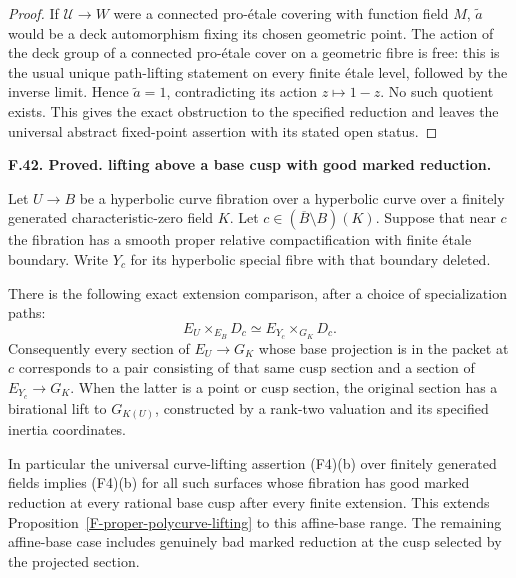\documentclass[11pt,oneside]{article}
\makeatletter
\newcounter{statementanchor}
\newenvironment{statement}[3]{%
 \refstepcounter{statementanchor}\def\@currentlabel{#1}%
 \par\addvspace{9pt}\noindent
 \textbf{#1. #2. #3.}\par\nobreak\noindent\ignorespaces
}{\par\addvspace{5pt}}
\makeatother
\begin{document}
\begin{proof}
If $\mathcal U\to W$ were a connected pro-\'etale
covering with function field $M$, $\widetilde a$ would
be a deck automorphism fixing its chosen geometric point.
The action of the deck group of a connected pro-\'etale
cover on a geometric fibre is free: this is the usual
unique path-lifting statement on every finite \'etale
level, followed by the inverse limit. Hence
$\widetilde a=1$, contradicting its action $z\mapsto1-z$.
No such quotient exists. This gives the exact obstruction
to the specified reduction and leaves the universal
abstract fixed-point assertion with its stated open status.
\end{proof}

\begin{statement}{F.42}{Proved}{lifting above a base cusp with good marked reduction}
\label{st:F.42}
\label{F-good-boundary-lifting}
Let $U\to B$ be a hyperbolic curve fibration over a hyperbolic
curve over a finitely generated characteristic-zero field $K$.
Let $c\in(\overline B\setminus B)(K)$. Suppose that near $c$
the fibration has a smooth proper relative compactification
with finite \'etale boundary. Write $Y_c$ for its hyperbolic
special fibre with that boundary deleted.

There is the following exact extension comparison, after a
choice of specialization paths:
\[
 E_U\mathbin{\times}_{E_B}D_c
       \simeq E_{Y_c}\mathbin{\times}_{G_K}D_c.
 \tag{F.42.1}
\]
Consequently every section of $E_U\to G_K$ whose base
projection is in the packet at $c$ corresponds to a pair
consisting of that same cusp section and a section of
$E_{Y_c}\to G_K$. When the latter is a point or cusp
section, the original section has a birational lift to
$G_{K(U)}$, constructed by a rank-two valuation and its
specified inertia coordinates.

In particular the universal curve-lifting assertion (F4)(b)
over finitely generated fields implies (F4)(b) for all such
surfaces whose fibration has good marked reduction at every
rational base cusp after every finite extension. This extends
Proposition~\ref{F-proper-polycurve-lifting} to this affine-base
range. The remaining affine-base case includes genuinely bad
marked reduction at the cusp selected by the projected section.
\end{statement}
\end{document}
